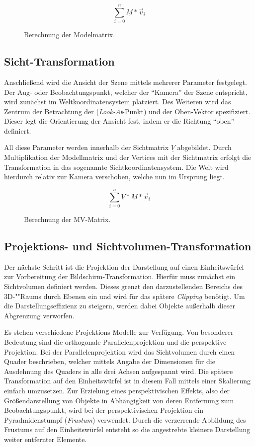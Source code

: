 \begin{figure}[!h]
	\begin{displaymath}
		\sum_{i=0}^{n} \underline{M} * \vec{v}_i
	\end{displaymath}
	\caption{Berechnung der Modelmatrix.}
\end{figure}

\subsection{Sicht-Transformation}

Anschließend wird die Ansicht der Szene mittels mehrerer Parameter festgelegt. Der Aug- oder Beobachtungspunkt, welcher der \enquote{Kamera} der Szene entspricht, wird zunächst im Weltkoordinatensystem platziert. Des Weiteren wird das Zentrum der Betrachtung der (\emph{Look-At}-Punkt) und der Oben-Vektor spezifiziert. Dieser legt die Orientierung der Ansicht fest, indem er die Richtung \enquote{oben} definiert.

All diese Parameter werden innerhalb der Sichtmatrix $\underline{V}$ abgebildet. Durch Multiplikation der Modellmatrix und der Vertices mit der Sichtmatrix erfolgt die Transformation in das sogenannte Sichtkoordinatensystem. Die Welt wird hierdurch relativ zur Kamera verschoben, welche nun im Ursprung liegt.

\begin{figure}[!h]
	\begin{displaymath}
		\sum_{i=0}^{n} \underline{V} * \underline{M} * \vec{v}_i
	\end{displaymath}
	\caption{Berechnung der MV-Matrix.}
\end{figure}

\subsection{Projektions- und Sichtvolumen-Transformation}
Der nächste Schritt ist die Projektion der Darstellung auf einen Einheitswürfel zur Vorbereitung der Bildschirm-Transformation. Hierfür muss zunächst ein Sichtvolumen definiert werden. Dieses grenzt den darzustellenden Bereichs des 3D-""Raums durch Ebenen ein und wird für das spätere \emph{Clipping} benötigt. Um die Darstellungseffizienz zu steigern, werden dabei Objekte außerhalb dieser Abgrenzung verworfen.

Es stehen verschiedene Projektions-Modelle zur Verfügung. Von besonderer Bedeutung sind die orthogonale Parallelenprojektion und die perspektive Projektion.
Bei der Parallelenprojektion wird das Sichtvolumen durch einen Quader beschrieben, welcher mittels Angabe der Dimensionen für die Ausdehnung des Quaders in alle drei Achsen aufgespannt wird. Die spätere Transformation auf den Einheitswürfel ist in diesem Fall mittels einer Skalierung einfach umzusetzen.
Zur Erzielung eines perspektivischen Effekts, also der Größendarstellung von Objekte in Abhängigkeit von deren Entfernung zum Beobachtungspunkt, wird bei der perspektivischen Projektion ein Pyradmidenstumpf (\emph{Frustum}) verwendet. Durch die verzerrende Abbildung des Frustums auf den Einheitswürfel entsteht so die angestrebte kleinere Darstellung weiter entfernter Elemente.

